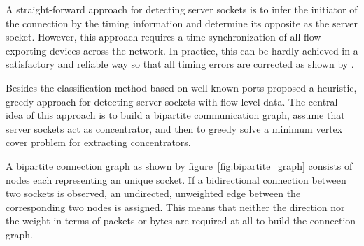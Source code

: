A straight-forward approach for detecting \glspl{server socket} is to infer the
initiator of the connection by the timing information and determine its opposite
as the \gls{server socket}. However, this approach requires a time
synchronization of all flow exporting devices across the network. In practice,
this can be hardly achieved in a satisfactory and reliable way so that all
timing errors are corrected as shown by \citet{Trammell}.

Besides the classification method based on well known ports
\citet{Schatzmann:Mining,Schatzmann:Dissection,Schatzmann:Tracing} proposed a
heuristic, greedy approach for detecting \glspl{server socket} with flow-level
data. The central idea of this approach is to build a bipartite communication
graph, assume that server sockets act as concentrator, and then to greedy solve
a minimum vertex cover problem for extracting concentrators.

A bipartite connection graph as shown by figure \ref{fig:bipartite_graph}
consists of nodes each representing an unique socket. If a bidirectional
connection between two sockets is observed, an undirected, unweighted edge
between the corresponding two nodes is assigned. This means that neither the
direction nor the weight in terms of packets or bytes are required at all to
build the connection graph.

